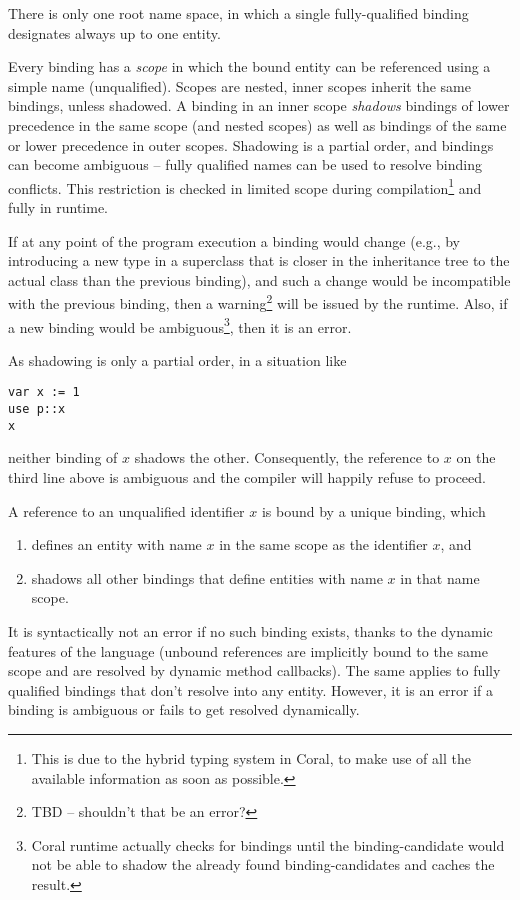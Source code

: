 There is only one root name space, in which a single fully-qualified binding designates always up to one entity. 

Every binding has a \emph{scope} in which the bound entity can be referenced using a simple name (unqualified). Scopes are nested, inner scopes inherit the same bindings, unless shadowed. A binding in an inner scope \emph{shadows} bindings of lower precedence in the same scope (and nested scopes) as well as bindings of the same or lower precedence in outer scopes. Shadowing is a partial order, and bindings can become ambiguous -- fully qualified names can be used to resolve binding conflicts. This restriction is checked in limited scope during compilation\footnote{This is due to the hybrid typing system in Coral, to make use of all the available information as soon as possible.} and fully in runtime. 

If at any point of the program execution a binding would change (e.g., by introducing a new type in a superclass that is closer in the inheritance tree to the actual class than the previous binding), and such a change would be incompatible with the previous binding, then a warning\footnote{TBD -- shouldn't that be an error?} will be issued by the runtime. Also, if a new binding would be ambiguous\footnote{Coral runtime actually checks for bindings until the binding-candidate would not be able to shadow the already found binding-candidates and caches the result.}, then it is an error. 

As shadowing is only a partial order, in a situation like

\begin{lstlisting}
var x := 1
use p::x
x
\end{lstlisting}

neither binding of $x$ shadows the other. Consequently, the reference to $x$ on the third line above is ambiguous and the compiler will happily refuse to proceed. 

A reference to an unqualified identifier $x$ is bound by a unique binding, which

\begin{enumerate}
\item defines an entity with name $x$ in the same scope as the identifier $x$, and
\item shadows all other bindings that define entities with name $x$ in that name scope.
\end{enumerate}

It is syntactically not an error if no such binding exists, thanks to the dynamic features of the language (unbound references are implicitly bound to the same scope and are resolved by dynamic method callbacks). The same applies to fully qualified bindings that don't resolve into any entity. However, it is an error if a binding is ambiguous or fails to get resolved dynamically.

